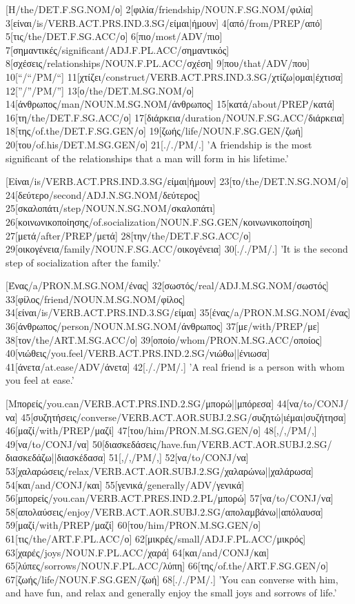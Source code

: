 \documentclass[extrafontsizes,17pt]{memoir}
\begin{document}
\begingroup
{}

\pex

\a

[Η/the/DET.F.SG.NOM/ο] 
2[φιλία/friendship/NOUN.F.SG.NOM/φιλία] 
3[είναι/is/VERB.ACT.PRS.IND.3.SG/είμαι|ήμουν]
4[από/from/PREP/από] 
5[τις/the/DET.F.SG.ACC/ο] 
6[πιο/most/ADV/πιο] 
7[σημαντικές/significant/ADJ.F.PL.ACC/σημαντικός] 
8[σχέσεις/relationships/NOUN.F.PL.ACC/σχέση] 
9[που/that/ADV/που] 
10[“/“/PM/“]
11[χτίζει/construct/VERB.ACT.PRS.IND.3.SG/χτίζω|ομαι|έχτισα]
12[”/”/PM/”] 
13[ο/the/DET.M.SG.NOM/ο] 
14[άνθρωπος/man/NOUN.M.SG.NOM/άνθρωπος] 
15[κατά/about/PREP/κατά] 
16[τη/the/DET.F.SG.ACC/ο] 
17[διάρκεια/duration/NOUN.F.SG.ACC/διάρκεια] 
18[της/of.the/DET.F.SG.GEN/ο] 
19[ζωής/life/NOUN.F.SG.GEN/ζωή] 
20[του/of.his/DET.M.SG.GEN/ο]
21[././PM/.] 
\glft 
'A friendship is the most significant of the relationships that a man will form in his lifetime.'
\endgl

\a

[Είναι/is/VERB.ACT.PRS.IND.3.SG/είμαι|ήμουν]
23[το/the/DET.N.SG.NOM/ο]
24[δεύτερο/second/ADJ.N.SG.NOM/δεύτερος]
25[σκαλοπάτι/step/NOUN.N.SG.NOM/σκαλοπάτι]
26[κοινωνικοποίησης/of.socialization/NOUN.F.SG.GEN/κοινωνικοποίηση]
27[μετά/after/PREP/μετά]
28[την/the/DET.F.SG.ACC/ο]
29[οικογένεια/family/NOUN.F.SG.ACC/οικογένεια]
30[././PM/.]
\glft 
'It is the second step of socialization after the family.'
\endgl

\a

[Ένας/a/PRON.M.SG.NOM/ένας]
32[σωστός/real/ADJ.M.SG.NOM/σωστός]
33[φίλος/friend/NOUN.M.SG.NOM/φίλος]
34[είναι/is/VERB.ACT.PRS.IND.3.SG/είμαι]
35[ένας/a/PRON.M.SG.NOM/ένας]
36[άνθρωπος/person/NOUN.M.SG.NOM/άνθρωπος]
37[με/with/PREP/με]
38[τον/the/ART.M.SG.ACC/ο]
39[οποίο/whom/PRON.M.SG.ACC/οποίος]
40[νιώθεις/you.feel/VERB.ACT.PRS.IND.2.SG/νιώθω||ένιωσα]
41[άνετα/at.ease/ADV/άνετα]
42[././PM/.]
\glft 
'A real friend is a person with whom you feel at ease.'
\endgl

\a

[Μπορείς/you.can/VERB.ACT.PRS.IND.2.SG/μπορώ||μπόρεσα]
44[να/to/CONJ/να]
45[συζητήσεις/converse/VERB.ACT.AOR.SUBJ.2.SG/συζητώ|ιέμαι|συζήτησα]
46[μαζί/with/PREP/μαζί]
47[του/him/PRON.M.SG.GEN/ο]
48[,/,/PM/,]
49[να/to/CONJ/να]
50[διασκεδάσεις/have.fun/VERB.ACT.AOR.SUBJ.2.SG/διασκεδάζω||διασκέδασα]
51[,/,/PM/,]
52[να/to/CONJ/να]
53[χαλαρώσεις/relax/VERB.ACT.AOR.SUBJ.2.SG/χαλαρώνω||χαλάρωσα]
54[και/and/CONJ/και]
55[γενικά/generally/ADV/γενικά]
56[μπορείς/you.can/VERB.ACT.PRES.IND.2.PL/μπορώ]
57[να/to/CONJ/να]
58[απολαύσεις/enjoy/VERB.ACT.AOR.SUBJ.2.SG/απολαμβάνω||απόλαυσα]
59[μαζί/with/PREP/μαζί]
60[του/him/PRON.M.SG.GEN/ο]
61[τις/the/ART.F.PL.ACC/ο]
62[μικρές/small/ADJ.F.PL.ACC/μικρός]
63[χαρές/joys/NOUN.F.PL.ACC/χαρά]
64[και/and/CONJ/και]
65[λύπες/sorrows/NOUN.F.PL.ACC/λύπη]
66[της/of.the/ART.F.SG.GEN/ο]
67[ζωής/life/NOUN.F.SG.GEN/ζωή]
68[././PM/.]
\glft 
'You can converse with him, and have fun, and relax and generally enjoy the small joys and sorrows of life.'
\endgl
\end{document}
